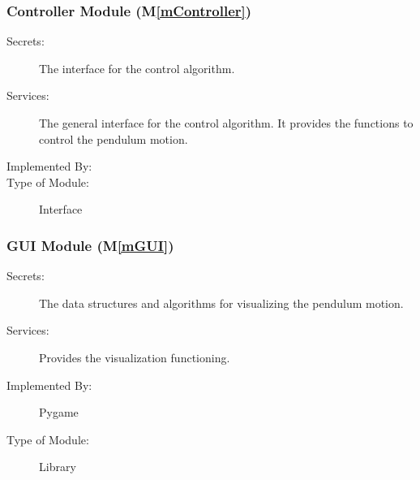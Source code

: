 \documentclass[12pt, titlepage]{article}
\newcommand{\mref}[1]{M\ref{#1}}
\begin{document}
\subsubsection{Controller Module (\mref{mController})}

\begin{description}
\item[Secrets:] The interface for the control algorithm.
\item[Services:] The general interface for the control algorithm. It provides the
                 functions to control the pendulum motion.
\item[Implemented By:] \progname{}
\item[Type of Module:] Interface
\end{description}

\subsubsection{GUI Module (\mref{mGUI})}

\begin{description}
\item[Secrets:] The data structures and algorithms for visualizing the pendulum motion.
\item[Services:] Provides the visualization functioning.
\item[Implemented By:] Pygame
\item[Type of Module:] Library
\end{description}


\end{document}
